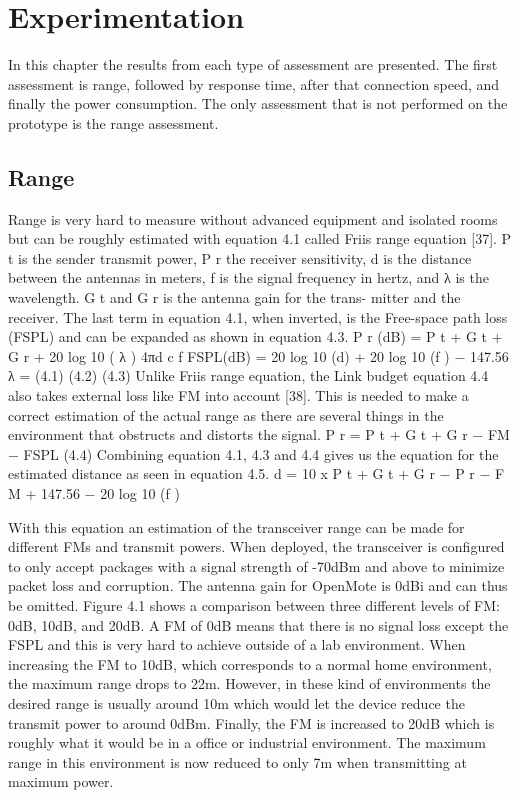 \section{Experimentation}

In this chapter the results from each type of assessment are presented.
The first assessment is range,
	followed by response time,
	after that connection speed,
	and finally the power consumption.
The only assessment that is not performed on the prototype is the range assessment.

\subsection{Range}
Range is very hard to measure without advanced equipment and isolated
rooms but can be roughly estimated with equation 4.1 called Friis range
equation [37]. P t is the sender transmit power, P r the receiver sensitivity, d
is the distance between the antennas in meters, f is the signal frequency in
hertz, and λ is the wavelength. G t and G r is the antenna gain for the trans-
mitter and the receiver. The last term in equation 4.1, when inverted, is the
Free-space path loss (FSPL) and can be expanded as shown in equation 4.3.
P r (dB) = P t + G t + G r + 20 log 10 (
λ
)
4πd
c
f
FSPL(dB) = 20 log 10 (d) + 20 log 10 (f ) − 147.56
λ =
(4.1)
(4.2)
(4.3)
Unlike Friis range equation, the Link budget equation 4.4 also takes external
loss like FM into account [38]. This is needed to make a correct estimation of
the actual range as there are several things in the environment that obstructs
and distorts the signal.
P r = P t + G t + G r − FM − FSPL
(4.4)
Combining equation 4.1, 4.3 and 4.4 gives us the equation for the estimated
distance as seen in equation 4.5.
d = 10 x
P t + G t + G r − P r − F M + 147.56 − 20 log 10 (f )


With this equation an estimation of the transceiver range can be made for different FMs and transmit powers.
When deployed,
	the transceiver is configured to only accept packages with a signal strength of -70dBm and above to minimize packet loss and corruption.
The antenna gain for OpenMote is 0dBi and can thus be omitted.
Figure 4.1 shows a comparison between three different levels of FM: 0dB, 10dB,
	and 20dB.
A FM of 0dB means that there is no signal loss except the FSPL and this is very hard to achieve outside of a lab environment.
When increasing the FM to 10dB,
	which corresponds to a normal home environment,
	the maximum range drops to 22m.
However,
	in these kind of environments the desired range is usually around 10m which would let the device reduce the transmit power to around 0dBm.
Finally,
	the FM is increased to 20dB which is roughly what it would be in a office or industrial environment.
The maximum range in this environment is now reduced to only 7m when transmitting at maximum power.


